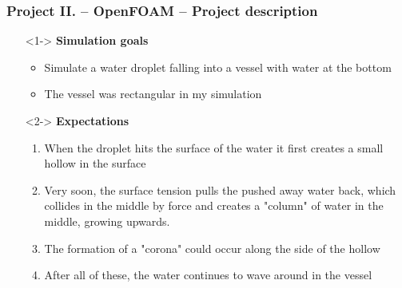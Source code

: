 \begin{frame}
\frametitle{Project II. -- OpenFOAM -- Project description}

\begin{itemize}
	\item[]<1-> \textbf{Simulation goals}
	\begin{itemize}
		\item<1-> Simulate a water droplet falling into a vessel with water at the bottom
		\item<1-> The vessel was rectangular in my simulation
	\end{itemize}
	\item[]<2-> \textbf{Expectations}
	\begin{enumerate}
		\item<2-> When the droplet hits the surface of the water it first creates a small hollow in the surface
		\item<2-> Very soon, the surface tension pulls the pushed away water back, which collides in the middle by force and creates a "column" of water in the middle, growing upwards.
		\item<2-> The formation of a "corona" could occur along the side of the hollow
		\item<2-> After all of these, the water continues to wave around in the vessel
	\end{enumerate}
\end{itemize}

\end{frame}
